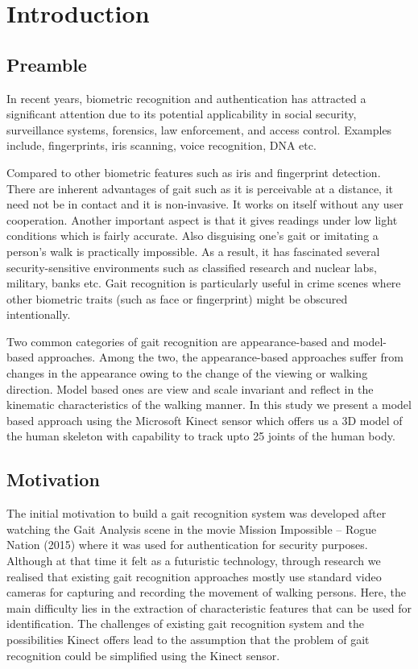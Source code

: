 \chapter{Introduction} \label{Introduction}

\section{Preamble} \label{Preamble}
\noindent In recent years, biometric recognition and authentication has attracted a significant attention due to its potential applicability in social security, surveillance systems, forensics, law enforcement, and access control. Examples include, fingerprints, iris scanning, voice recognition, DNA etc. 

\noindent Compared to other biometric features such as iris and fingerprint detection. There are inherent advantages of gait such as it is perceivable at a distance, it need not be in contact and it is non-invasive. It works on itself without any user cooperation. Another important aspect is that it gives readings under low light conditions which is fairly accurate. Also disguising one’s gait or imitating a person’s walk is practically impossible. As a result, it has fascinated several security-sensitive environments such as classified research and nuclear labs, military, banks etc. Gait recognition is particularly useful in crime scenes where other biometric traits (such as face or fingerprint) might be obscured intentionally. 

\noindent Two common categories of gait recognition are appearance-based and model-based approaches. Among the two, the appearance-based approaches suffer from changes in the appearance owing to the change of the viewing or walking direction. Model based ones are view and scale invariant and reflect in the kinematic characteristics of the walking manner. In this study we present a model based approach using the Microsoft Kinect sensor which offers us a 3D model of the human skeleton with capability to track upto 25 joints of the human body.
 
\section{Motivation}\label{Motivation}
\noindent The initial motivation to build a gait recognition system was developed after watching the Gait Analysis scene in the movie Mission Impossible – Rogue Nation (2015) where it was used for authentication for security purposes. Although at that time it felt as a futuristic technology, through research we realised that existing gait recognition approaches mostly use standard video cameras for capturing and recording the movement of walking persons. Here, the main difficulty lies in the extraction of characteristic features that can be used for identification. The challenges of existing gait recognition system and the possibilities Kinect offers lead to the assumption that the problem of gait recognition could be simplified using the Kinect sensor.
\newpage

